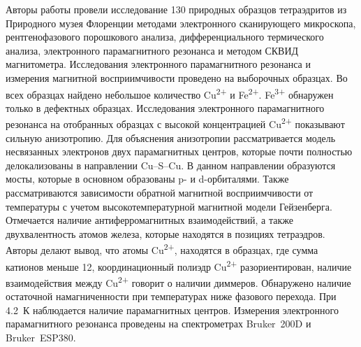 Авторы работы \cite{DiBenedetto2002} провели исследование 130  природных образцов тетраэдритов из Природного музея Флоренции методами электронного сканирующего микроскопа, рентгенофазового порошкового анализа, дифференциального термического анализа, электронного парамагнитного резонанса и методом СКВИД магнитометра. Исследования электронного парамагнитного резонанса и измерения магнитной восприимчивости проведено на выборочных образцах. Во всех образцах найдено небольшое количество Cu\textsuperscript{2+} и Fe\textsuperscript{2+}. Fe\textsuperscript{3+} обнаружен только в дефектных образцах. Исследования электронного парамагнитного резонанса на отобранных образцах с высокой концентрацией Cu\textsuperscript{2+} показывают сильную анизотропию. Для объяснения анизотропии рассматривается модель несвязанных электронов двух парамагнитных центров, которые почти полностью делокализованы в направлении Cu--S--Cu. В данном направлении образуются мосты, которые в основном образованы p- и d-орбиталями\cite{Albright_2013}. Также рассматриваются зависимости обратной магнитной восприимчивости от температуры с учетом высокотемпературной магнитной модели Гейзенберга. Отмечается наличие антиферромагнитных взаимодействий, а также двухвалентность атомов железа, которые находятся в позициях тетраэдров. Авторы делают вывод, что атомы Cu\textsuperscript{2+}, находятся в образцах, где сумма катионов меньше 12, координационный полиэдр Cu\textsuperscript{2+} разориентирован, наличие взаимодействия между Cu\textsuperscript{2+} говорит о наличии диммеров. Обнаружено наличие остаточной намагниченности при температурах ниже фазового перехода. При 4.2~К наблюдается наличие парамагнитных центров.  Измерения электронного парамагнитного резонанса проведены на спектрометрах Bruker~200D и Bruker~ESP380.

